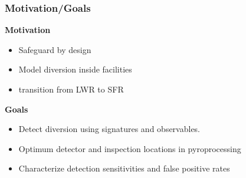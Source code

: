 \begin{frame}
  \frametitle{Motivation/Goals}
  	\textbf{Motivation}
        \begin{itemize}
                \item Safeguard by design
                \item Model diversion inside facilities
                \item transition from LWR to SFR
        \end{itemize}
    \textbf{Goals}
    	\begin{itemize}
    		\item Detect diversion using signatures and observables.
    		\item Optimum detector and inspection locations in pyroprocessing
    		\item Characterize detection sensitivities and false positive rates
    	\end{itemize}
\end{frame}

